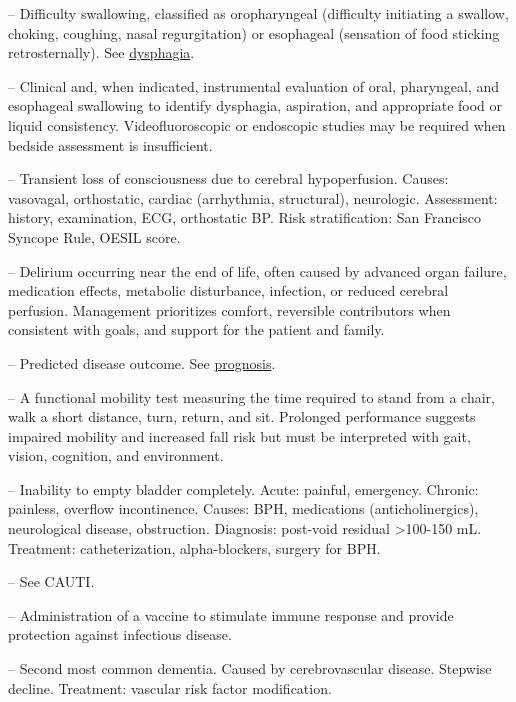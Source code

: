 -- Difficulty swallowing, classified as oropharyngeal (difficulty initiating a swallow, choking, coughing, nasal regurgitation) or esophageal (sensation of food sticking retrosternally). See \hyperlink{Dysphagia}{dysphagia}.

-- Clinical and, when indicated, instrumental evaluation of oral, pharyngeal, and esophageal swallowing to identify dysphagia, aspiration, and appropriate food or liquid consistency. Videofluoroscopic or endoscopic studies may be required when bedside assessment is insufficient.

-- Transient loss of consciousness due to cerebral hypoperfusion. Causes: vasovagal, orthostatic, cardiac (arrhythmia, structural), neurologic. Assessment: history, examination, ECG, orthostatic BP. Risk stratification: San Francisco Syncope Rule, OESIL score.

-- Delirium occurring near the end of life, often caused by advanced organ failure, medication effects, metabolic disturbance, infection, or reduced cerebral perfusion. Management prioritizes comfort, reversible contributors when consistent with goals, and support for the patient and family.

-- Predicted disease outcome. See \hyperlink{Prognosis}{prognosis}.

-- A functional mobility test measuring the time required to stand from a chair, walk a short distance, turn, return, and sit. Prolonged performance suggests impaired mobility and increased fall risk but must be interpreted with gait, vision, cognition, and environment.

-- Inability to empty bladder completely. Acute: painful, emergency. Chronic: painless, overflow incontinence. Causes: BPH, medications (anticholinergics), neurological disease, obstruction. Diagnosis: post-void residual >100-150 mL. Treatment: catheterization, alpha-blockers, surgery for BPH.

-- See CAUTI.

-- Administration of a vaccine to stimulate immune response and provide protection against infectious disease.

-- Second most common dementia. Caused by cerebrovascular disease. Stepwise decline. Treatment: vascular risk factor modification.

